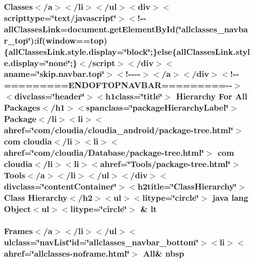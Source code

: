 \hypertarget{overview-tree_8html_aac3322e12d911341c3d470b46b2d80f4}{
\subsubsection[{lt}]{\setlength{\rightskip}{0pt plus 5cm}Classes$<$/{\bf a}$>$$<$/li$>$$<$/ul$>$$<$div$>$$<$scripttype=\char`\"{}text/javascript\char`\"{}$>$$<$!-\/-\/all\-Classes\-Link=document.\-get\-Element\-By\-Id(\char`\"{}allclasses\-\_\-navbar\-\_\-top\char`\"{});if(window==top)\{all\-Classes\-Link.\-style.\-display=\char`\"{}block\char`\"{};\}else\{all\-Classes\-Link.\-style.\-display=\char`\"{}none\char`\"{};\}$<$/script$>$$<$/div$>$$<$aname=\char`\"{}skip.\-navbar.\-top\char`\"{}$>$$<$!-\/-\/-\/-\/$>$$<$/a$>$$<$/div$>$$<$!-\/-\/=========E\-N\-D\-O\-F\-T\-O\-P\-N\-A\-V\-B\-A\-R=========-\/-\/$>$$<$divclass=\char`\"{}header\char`\"{}$>$$<$h1class=\char`\"{}title\char`\"{}$>$ Hierarchy For All Packages$<$/h1$>$$<$spanclass=\char`\"{}package\-Hierarchy\-Label\char`\"{}$>$ Package$<$/li$>$$<$li$>$$<$ahref=\char`\"{}com/cloudia/cloudia\-\_\-android/package-\/tree.\-html\char`\"{}$>$ com cloudia$<$/li$>$$<$li$>$$<$ahref=\char`\"{}com/cloudia/Database/package-\/tree.\-html\char`\"{}$>$ com cloudia$<$/li$>$$<$li$>$$<$ahref=\char`\"{}Tools/package-\/tree.\-html\char`\"{}$>$ Tools$<$/{\bf a}$>$$<$/li$>$$<$/ul$>$$<$/div$>$$<$divclass=\char`\"{}content\-Container\char`\"{}$>$$<$h2title=\char`\"{}Class\-Hierarchy\char`\"{}$>$ Class Hierarchy$<$/h2$>$$<$ul$>$$<$litype=\char`\"{}circle\char`\"{}$>$ java lang Object$<$ul$>$$<$litype=\char`\"{}circle\char`\"{}$>$ \& lt}}\label{overview-tree_8html_aac3322e12d911341c3d470b46b2d80f4}
\hypertarget{overview-tree_8html_af43198c3b54c4bc836554c5ac67d0f12}{
\subsubsection[{nbsp}]{\setlength{\rightskip}{0pt plus 5cm}Frames$<$/{\bf a}$>$$<$/li$>$$<$/ul$>$$<$ulclass=\char`\"{}nav\-List\char`\"{}id=\char`\"{}allclasses\-\_\-navbar\-\_\-bottom\char`\"{}$>$$<$li$>$$<$ahref=\char`\"{}allclasses-\/noframe.\-html\char`\"{}$>$ All\& nbsp}}\label{overview-tree_8html_af43198c3b54c4bc836554c5ac67d0f12}
